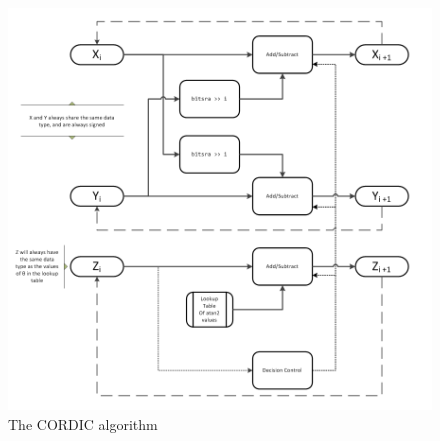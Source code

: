 \documentclass[12pt, a4paper,oneside]{article}
\begin{document}
\begin{figure}[h]
	\centering
	\includegraphics[width = \linewidth]{cordic_rotationkernel.png}
	\caption{The CORDIC algorithm}
	\label{fig:cordic_algorithm}
\end{figure}

\printbibliography
\end{document}
